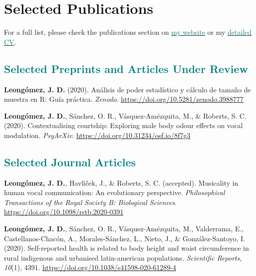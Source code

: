 \documentclass[11pt, a4paper]{awesome-cv}
\begin{document}
\hypertarget{selected-publications}{%
\section{Selected Publications}\label{selected-publications}}

For a full list, please check the publications section on
\href{https://jdleongomez.info/en/publication/}{\textcolor{teal}{my website}}
or my
\href{https://jdleongomez.info/en/files/jdl_cv_en.pdf}{\textcolor{teal}{detailed CV}}.

\hypertarget{section}{%
\subsection{\texorpdfstring{\textcolor{teal}{Selected Preprints and Articles Under Review}}{}}\label{section}}

\begingroup
\setlength{\parindent}{-0.5in}
\setlength{\leftskip}{0.5in}

\hypertarget{refs_featured_preprint}{}
\leavevmode\hypertarget{ref-Leongomez2020a}{}%
\textbf{Leongómez, J. D.} (2020). {Análisis de poder estadístico y
cálculo de tamaño de muestra en R: Guía práctica}. \emph{Zenodo}.
\url{https://doi.org/10.5281/zenodo.3988777}

\leavevmode\hypertarget{ref-Leongomez2020}{}%
\textbf{Leongómez, J. D.}, Sánchez, O. R., Vásquez-Amézquita, M., \&
Roberts, S. C. (2020). Contextualising courtship: Exploring male body
odour effects on vocal modulation. \emph{PsyArXiv}.
\url{https://doi.org/10.31234/osf.io/8f7g3}

\endgroup

\hypertarget{section-1}{%
\subsection{\texorpdfstring{\textcolor{teal}{Selected Journal Articles}}{}}\label{section-1}}

\begingroup
\setlength{\parindent}{-0.5in}
\setlength{\leftskip}{0.5in}

\hypertarget{refs_featured}{}
\leavevmode\hypertarget{ref-leongomezMusicalityHumanVocal2021}{}%
\textbf{Leongómez, J. D.}, Havlíček, J., \& Roberts, S. C. (accepted).
Musicality in human vocal communication: {An} evolutionary perspective.
\emph{Philosophical Transactions of the Royal Society B: Biological
Sciences}. \url{https://doi.org/10.1098/rstb.2020-0391}

\leavevmode\hypertarget{ref-Leonguxf3mez2020}{}%
\textbf{Leongómez, J. D.}, Sánchez, O. R., Vásquez-Amézquita, M.,
Valderrama, E., Castellanos-Chacón, A., Morales-Sánchez, L., Nieto, J.,
\& González-Santoyo, I. (2020). Self-reported health is related to body
height and waist circumference in rural indigenous and urbanised
latin-american populations. \emph{Scientific Reports}, \emph{10}(1),
4391. \url{https://doi.org/10.1038/s41598-020-61289-4}
\end{document}
